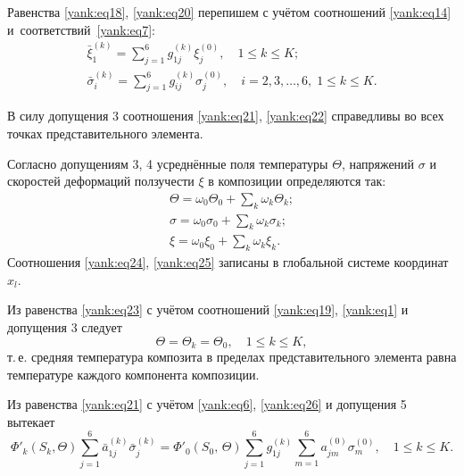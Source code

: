 Равенства \eqref{yank:eq18}, \eqref{yank:eq20} перепишем с учётом соотношений \eqref{yank:eq14} и~соответствий~\eqref{yank:eq7}:
\begin{gather}
\label{yank:eq21}
\bar {\xi }_1^{(k)} =\sum\limits_{j=1}^6
g_{1j}^{(k)} \xi _j^{(0)},\quad 1\le k\le K;\\
\label{yank:eq22}
 \bar {\sigma }_i^{(k)} =\sum\limits_{j=1}^6
g_{ij}^{(k)} \sigma _j^{(0)},\quad i=2, 3, \dots, 6,\; 1\le k\le K.
\end{gather}

В силу допущения 3 соотношения \eqref{yank:eq21}, \eqref{yank:eq22} справедливы во всех точках
представительного элемента.

Согласно допущениям 3, 4 усреднённые поля температуры $\Theta $, напряжений
$\sigma $ и скоростей деформаций ползучести $\xi $ в композиции определяются
так:
\begin{gather}
\label{yank:eq23} \Theta =\omega _0 \Theta _0 +\sum\limits_k
\omega _k \Theta _k;\\
\label{yank:eq24} \sigma =\omega _0 \sigma _0 +\sum\limits_k
\omega _k \sigma _k;\\
\label{yank:eq25} \xi =\omega _0 \xi _0 +\sum\limits_k \omega _k
\xi _k.
\end{gather}
Соотношения \eqref{yank:eq24}, \eqref{yank:eq25} записаны в глобальной системе координат $x_l$.

Из равенства \eqref{yank:eq23} с учётом соотношений \eqref{yank:eq19}, \eqref{yank:eq1} и допущения 3 следует
\begin{equation}
\label{yank:eq26}
\Theta =\Theta _k =\Theta _0, \quad 1\le k\le K,
\end{equation}
т.\,е. средняя температура композита в пределах представительного элемента
равна температуре каждого компонента композиции.


Из равенства \eqref{yank:eq21} с учётом \eqref{yank:eq6}, \eqref{yank:eq26} и допущения 5 вытекает
\begin{equation}
\label{yank:eq27}
\Phi'_k ( S_k ,\Theta ) \sum\limits_{j=1}^6 \bar {a}_{1j}^{(k)} \bar {\sigma }_j^{(k)} = \Phi'_0 (S_0,\,\Theta) \sum\limits_{j=1}^6 g_{1j}^{(k)} \sum\limits_{m=1}^6 a_{jm}^{(0)} \sigma _m^{(0)},\quad 1\le k\le K.
\end{equation}

